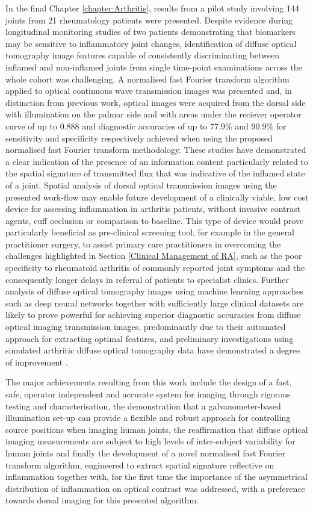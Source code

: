 \documentclass[twoside]{bhamthesis}
\theoremstyle{definition}
\begin{document}
In the final Chapter \ref{chapter:Arthritis}, results from a pilot study involving 144 joints from 21 rheumatology patients were presented. Despite evidence during longitudinal monitoring studies of two patients demonstrating that biomarkers may be sensitive to inflammatory joint changes, identification of diffuse optical tomography image features capable of consistently discriminating between inflamed and non-inflamed joints from single time-point examinations across the whole cohort was challenging. A normalised fast Fourier transform algorithm applied to optical continuous wave transmission images was presented and, in distinction from previous work, optical images were acquired from the dorsal side with illumination on the palmar side and with areas under the reciever operator curve of up to 0.888 and diagnostic accuracies of up to 77.9\% and 90.9\% for sensitivity and specificity respectively achieved when using the proposed normalised fast Fourier transform methodology. These studies have demonstrated a clear indication of the presence of an information content particularly related to the spatial signature of transmitted flux that was indicative of the inflamed state of a joint. Spatial analysis of dorsal optical transmission images using the presented work-flow may enable future development of a clinically viable, low cost device for assessing inflammation in arthritis patients, without invasive contrast agents, cuff occlusion or comparison to baseline. This type of device would prove particularly beneficial as pre-clinical screening tool, for example in the general practitioner surgery, to assist primary care practitioners in overcoming the challenges highlighted in Section \ref{Clinical Management of RA}, such as the poor specificity to rheumatoid arthritis of commonly reported joint symptoms and the consequently longer delays in referral of patients to specialist clinics. Further analysis of diffuse optical tomography images using machine learning approaches such as deep neural networks together with sufficiently large clinical datasets are likely to prove powerful for achieving superior diagnostic accuracies from diffuse optical imaging transmission images, predominantly due to their automated approach for extracting optimal features, and preliminary investigations using simulated arthritic diffuse optical tomography data have demonstrated a degree of improvement \cite{dehghani2019deep,feng2020application}. 

The major achievements resulting from this work include the design of a fast, safe, operator independent and accurate system for imaging through rigorous testing and characterisation, the demonstration that a galvanometer-based illumination set-up can provide a flexible and robust approach for controlling source positions when imaging human joints, the reaffirmation that diffuse optical imaging measurements are subject to high levels of inter-subject variability for human joints and finally the development of a novel normalised fast Fourier transform algorithm, engineered to extract spatial signature reflective on inflammation together with, for the first time the importance of the asymmetrical distribution of inflammation on optical contrast was addressed, with a preference towards dorsal imaging for this presented algorithm. 
\end{document}
